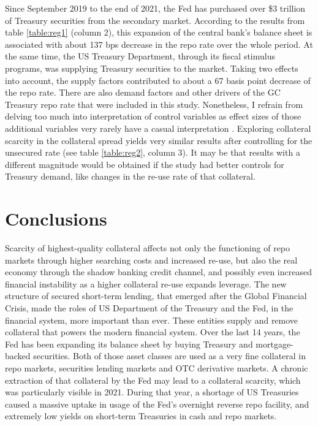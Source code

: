 \documentclass[11pt,a4paper,english,oneside]{article}
\begin{document}
Since September 2019 to the end of 2021, the Fed has purchased over \$3 trillion of Treasury securities from the secondary market. According to the results from table \ref{table:reg1} (column 2), this expansion of the central bank's balance sheet is associated with about 137 bps decrease in the repo rate over the whole period. At the same time, the US Treasury Department, through its fiscal stimulus programs, was supplying Treasury securities to the market. Taking two effects into account, the supply factors contributed to about a 67 basis point decrease of the repo rate. There are also demand factors and other drivers of the GC Treasury repo rate that were included in this study. Nonetheless, I refrain from delving too much into interpretation of control variables as effect sizes of those additional variables very rarely have a casual interpretation \citep{hunermund2020}. Exploring collateral scarcity in the collateral spread yields very similar results after controlling for the unsecured rate (see table \ref{table:reg2}, column 3). It may be that results with a different magnitude would be obtained if the study had better controls for Treasury demand, like changes in the re-use rate of that collateral. 

\newpage


\section{Conclusions} \label{sec:conclusion} 

Scarcity of highest-quality collateral affects not only the functioning of repo markets through higher searching costs and increased re-use, but also the real economy through the shadow banking credit channel, and possibly even increased financial instability as a higher collateral re-use expands leverage. The new structure of secured short-term lending, that emerged after the Global Financial Crisis, made the roles of US Department of the Treasury and the Fed, in the financial system, more important than ever. These entities supply and remove collateral that powers the modern financial system. Over the last 14 years, the Fed has been expanding its balance sheet by buying Treasury and mortgage-backed securities. Both of those asset classes are used as a very fine collateral in repo markets, securities lending markets and OTC derivative markets. A chronic extraction of that collateral by the Fed may lead to a collateral scarcity, which was particularly visible in 2021. During that year, a shortage of US Treasuries caused a massive uptake in usage of the Fed's overnight reverse repo facility, and extremely low yields on short-term Treasuries in cash and repo markets.
\end{document}
